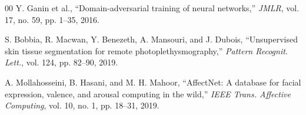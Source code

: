 \documentclass[conference]{IEEEtran}
\begin{document}
\begin{thebibliography}{00}
 Y. Ganin et al., ``Domain-adversarial training of
neural networks,'' \emph{JMLR}, vol. 17, no. 59, pp. 1--35, 2016.

 S. Bobbia, R. Macwan, Y. Benezeth, A. Mansouri,
and J. Dubois, ``Unsupervised skin tissue segmentation for remote
photoplethysmography,'' \emph{Pattern Recognit. Lett.}, vol. 124,
pp. 82--90, 2019.

 A. Mollahosseini, B. Hasani, and
M. H. Mahoor, ``AffectNet: A database for facial expression, valence,
and arousal computing in the wild,'' \emph{IEEE Trans. Affective
Computing}, vol. 10, no. 1, pp. 18--31, 2019.

\end{thebibliography}
\end{document}
